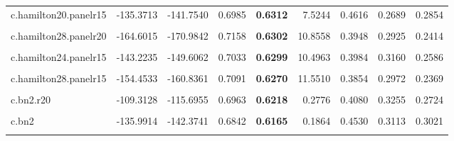 \documentclass[
  12pt,
]{article}
\begin{document}
\begin{table}[H]
{\begin{tabular}[t]{lrrr>{}rrrrr}
c.hamilton20.panelr15 & -135.3713 & -141.7540 & 0.6985 & \textbf{0.6312} & 7.5244 & 0.4616 & 0.2689 & 0.2854\\
\cellcolor{gray!6}{c.hamilton13.panelr15} & \cellcolor{gray!6}{-126.2968} & \cellcolor{gray!6}{-132.6796} & \cellcolor{gray!6}{0.6924} & \textbf{\cellcolor{gray!6}{0.6311}} & \cellcolor{gray!6}{6.5289} & \cellcolor{gray!6}{0.4297} & \cellcolor{gray!6}{0.2830} & \cellcolor{gray!6}{0.2647}\\
c.hamilton28.panelr20 & -164.6015 & -170.9842 & 0.7158 & \textbf{0.6302} & 10.8558 & 0.3948 & 0.2925 & 0.2414\\
\addlinespace
\cellcolor{gray!6}{c.hamilton24.panelr20} & \cellcolor{gray!6}{-155.8638} & \cellcolor{gray!6}{-162.2466} & \cellcolor{gray!6}{0.7096} & \textbf{\cellcolor{gray!6}{0.6301}} & \cellcolor{gray!6}{9.1672} & \cellcolor{gray!6}{0.4251} & \cellcolor{gray!6}{0.2830} & \cellcolor{gray!6}{0.2608}\\
c.hamilton24.panelr15 & -143.2235 & -149.6062 & 0.7033 & \textbf{0.6299} & 10.4963 & 0.3984 & 0.3160 & 0.2586\\
\cellcolor{gray!6}{c.hamilton20.panel} & \cellcolor{gray!6}{-126.8625} & \cellcolor{gray!6}{-133.2452} & \cellcolor{gray!6}{0.6907} & \textbf{\cellcolor{gray!6}{0.6288}} & \cellcolor{gray!6}{5.6212} & \cellcolor{gray!6}{0.4686} & \cellcolor{gray!6}{0.2830} & \cellcolor{gray!6}{0.2997}\\
c.hamilton28.panelr15 & -154.4533 & -160.8361 & 0.7091 & \textbf{0.6270} & 11.5510 & 0.3854 & 0.2972 & 0.2369\\
\cellcolor{gray!6}{c.hamilton13.panel} & \cellcolor{gray!6}{-133.9347} & \cellcolor{gray!6}{-140.3175} & \cellcolor{gray!6}{0.6922} & \textbf{\cellcolor{gray!6}{0.6250}} & \cellcolor{gray!6}{4.9769} & \cellcolor{gray!6}{0.4285} & \cellcolor{gray!6}{0.2877} & \cellcolor{gray!6}{0.2664}\\
\addlinespace
c.bn2.r20 & -109.3128 & -115.6955 & 0.6963 & \textbf{0.6218} & 0.2776 & 0.4080 & 0.3255 & 0.2724\\
\cellcolor{gray!6}{c.linear} & \cellcolor{gray!6}{-135.4069} & \cellcolor{gray!6}{-141.7896} & \cellcolor{gray!6}{0.6879} & \textbf{\cellcolor{gray!6}{0.6204}} & \cellcolor{gray!6}{3.9989} & \cellcolor{gray!6}{0.4616} & \cellcolor{gray!6}{0.2925} & \cellcolor{gray!6}{0.2986}\\
c.bn2 & -135.9914 & -142.3741 & 0.6842 & \textbf{0.6165} & 0.1864 & 0.4530 & 0.3113 & 0.3021\\
\cellcolor{gray!6}{c.bn6} & \cellcolor{gray!6}{-132.7915} & \cellcolor{gray!6}{-139.1742} & \cellcolor{gray!6}{0.6835} & \textbf{\cellcolor{gray!6}{0.6113}} & \cellcolor{gray!6}{0.4710} & \cellcolor{gray!6}{0.4371} & \cellcolor{gray!6}{0.2830} & \cellcolor{gray!6}{0.2712}\\

\end{tabular}}
\end{table}
\end{document}
